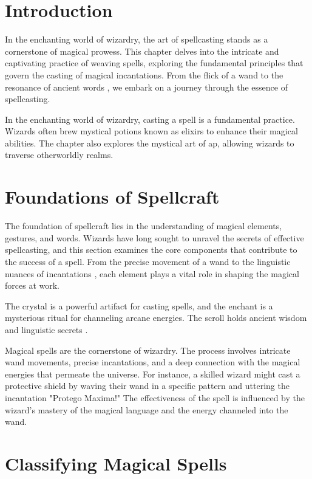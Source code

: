 
\section{Introduction}
In the enchanting world of wizardry, the art of spellcasting stands as a cornerstone of magical prowess. This chapter delves into the intricate and captivating practice of weaving spells, exploring the fundamental principles that govern the casting of magical incantations. From the flick of a \gls{wand} to the resonance of ancient words \cite{ancientspellcraft2018}, we embark on a journey through the essence of spellcasting.

In the enchanting world of wizardry, casting a \gls{spell} is a fundamental practice. Wizards often brew mystical potions known as \glspl{elixir} to enhance their magical abilities. The chapter also explores the mystical art of \gls{ap}, allowing wizards to traverse otherworldly realms.

\section{Foundations of Spellcraft}

The foundation of spellcraft lies in the understanding of magical elements, gestures, and words. Wizards have long sought to unravel the secrets of effective spellcasting, and this section examines the core components that contribute to the success of a spell. From the precise movement of a \gls{wand} \cite{wandmovements2019} to the linguistic nuances of incantations \cite{spellweaver2022}, each element plays a vital role in shaping the magical forces at work.

The \gls{crystal} is a powerful artifact for casting spells, and the \gls{enchant} is a mysterious ritual for channeling arcane energies. 
The \gls{scroll} holds ancient wisdom and linguistic secrets \cite{magiclanguage2021}.

Magical spells are the cornerstone of wizardry. The process involves intricate wand movements, precise incantations, and a deep connection with the magical energies that permeate the universe. For instance, a skilled wizard might cast a protective shield by waving their wand in a specific pattern and uttering the incantation "Protego Maxima!" The effectiveness of the spell is influenced by the wizard's mastery of the magical language and the energy channeled into the wand.

\section{Classifying Magical Spells}

